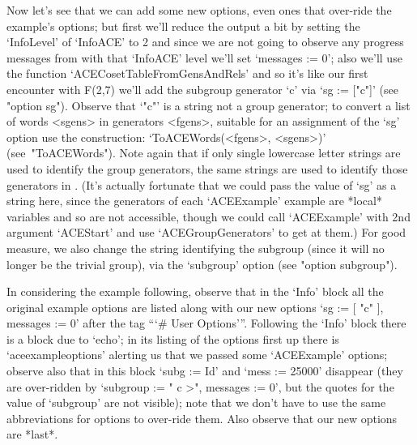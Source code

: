 Now let's see that we  can  add  some  new  options,  even  ones  that
over-ride the example's options; but first we'll reduce the  output  a
bit by setting the `InfoLevel' of `InfoACE' to 2 and since we are  not
going to observe any progress messages from {\ACE} with that `InfoACE'
level  we'll  set  `messages  :=  0';  also  we'll  use  the  function
`ACECosetTableFromGensAndRels' and so it's like  our  first  encounter
with F(2,7) we'll add the subgroup generator `c'  via  `sg  :=  ["c"]'
(see "option sg"). Observe that `"c"' is a string not a  {\GAP}  group
generator; to convert a list of {\GAP}  words  <sgens>  in  generators
<fgens>, suitable for  an  assignment  of  the  `sg'  option  use  the
construction: `ToACEWords(<fgens>, <sgens>)' (see~"ToACEWords").  Note
again that if  only  single  lowercase  letter  strings  are  used  to
identify the {\GAP} group generators, the same  strings  are  used  to
identify those generators in {\ACE}. (It's actually fortunate that  we
could pass the value of `sg' as a string here, since the generators of
each `ACEExample'  example  are  *local*  variables  and  so  are  not
accessible, though  we  could  call  `ACEExample'  with  2nd  argument
`ACEStart' and use `ACEGroupGenerators' to  get  at  them.)  For  good
measure, we also change the string identifying the subgroup (since  it
will no longer be the trivial group), via the `subgroup'  option  (see
"option subgroup").

In considering the example following, observe that in the `Info' block
all the original example options are listed along with our new options
`sg := [ "c" ], messages := 0' after the tag  ```\#  User  Options'''.
Following the `Info' block there is a block  due  to  `echo';  in  its
listing of the options first up there is `aceexampleoptions'  alerting
us that we passed some `ACEExample' options; observe also that in this
block `subg := Id' and `mess := 25000' disappear (they are over-ridden
by `subgroup := "\< c >", messages := 0', but the quotes for the value
of `subgroup' are not visible); note that we don't  have  to  use  the
same abbreviations for options to over-ride them.  Also  observe  that
our new options are *last*.

